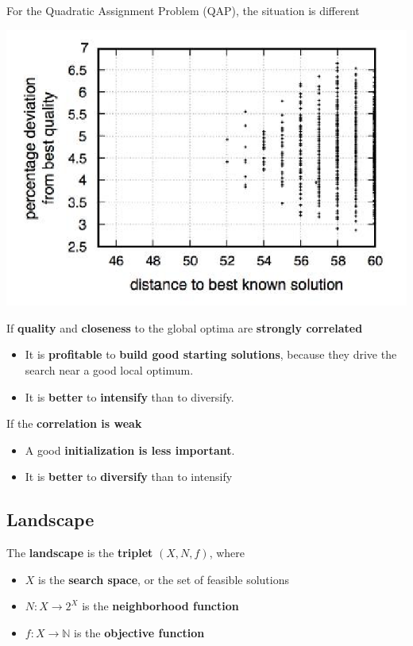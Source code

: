 \documentclass[11pt]{article}
\begin{document}
	For the Quadratic Assignment Problem (QAP), the situation is different
	\begin{center}
		\includegraphics[width=0.7\columnwidth]{img/QAP}
	\end{center}
	
	If \textbf{quality} and \textbf{closeness} to the global optima are \textbf{strongly correlated}
	\begin{itemize}
		\item It is \textbf{profitable} to \textbf{build good starting solutions}, because they drive the search near a good local optimum.\\
		
		\item It is \textbf{better} to \textbf{intensify} than to diversify.\\
	\end{itemize}
	
	If the \textbf{correlation is weak}
	\begin{itemize}
		\item A good \textbf{initialization is less important}.\\
		
		\item It is \textbf{better} to \textbf{diversify} than to intensify
	\end{itemize}
	
	\newpage
	
	\subsection{Landscape}
	The \textbf{landscape} is the \textbf{triplet} $(X , N, f )$, where
	\begin{itemize}
		\item $X$ is the \textbf{search space}, or the set of feasible solutions
		
		\item $N : X \rightarrow 2^X$ is the \textbf{neighborhood function}
		
		\item $f : X \rightarrow \mathbb{N}$ is the \textbf{objective function}
	\end{itemize}
	
\end{document}
